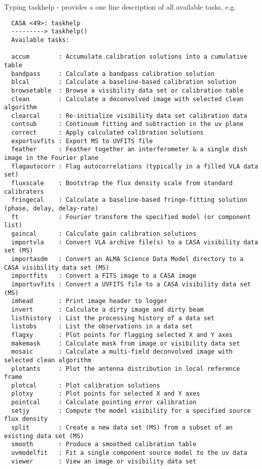 Typing taskhelp - provides a one line description of all available tasks, e.g.
\small
\begin{verbatim}
  CASA <49>: taskhelp
  ---------> taskhelp()
  Available tasks: 

  accum        : Accumulate calibration solutions into a cumulative table
  bandpass     : Calculate a bandpass calibration solution
  blcal        : Calculate a baseline-based calibration solution
  browsetable  : Browse a visibility data set or calibration table
  clean        : Calculate a deconvolved image with selected clean algorithm
  clearcal     : Re-initialize visibility data set calibration data
  contsub      : Continuum fitting and subtraction in the uv plane
  correct      : Apply calculated calibration solutions
  exportuvfits : Export MS to UVFITS file
  feather      : Feather together an interferometer & a single dish image in the Fourier plane
  flagautocorr : Flag autocorrelations (typically in a filled VLA data set)
  fluxscale    : Bootstrap the flux density scale from standard calibraters
  fringecal    : Calculate a baseline-based fringe-fitting solution (phase, delay, delay-rate)
  ft           : Fourier transform the specified model (or component list)
  gaincal      : Calculate gain calibration solutions
  importvla    : Convert VLA archive file(s) to a CASA visibility data set (MS)
  importasdm   : Convert an ALMA Science Data Model directory to a CASA visibility data set (MS)
  importfits   : Convert a FITS image to a CASA image
  importuvfits : Convert a UVFITS file to a CASA visibility data set (MS)
  imhead       : Print image header to logger
  invert       : Calculate a dirty image and dirty beam
  listhistory  : List the processing history of a data set
  listobs      : List the observations in a data set
  flagxy       : Plot points for flagging selected X and Y axes
  makemask     : Calculate mask from image or visibility data set
  mosaic       : Calculate a multi-field deconvolved image with selected clean algorithm
  plotants     : Plot the antenna distribution in local reference frame
  plotcal      : Plot calibration solutions
  plotxy       : Plot points for selected X and Y axes
  pointcal     : Calculate pointing error calibration
  setjy        : Compute the model visibility for a specified source flux density
  split        : Create a new data set (MS) from a subset of an existing data set (MS)
  smooth       : Produce a smoothed calibration table
  uvmodelfit   : Fit a single component source model to the uv data
  viewer       : View an image or visibility data set
\end{verbatim}
\normalsize


